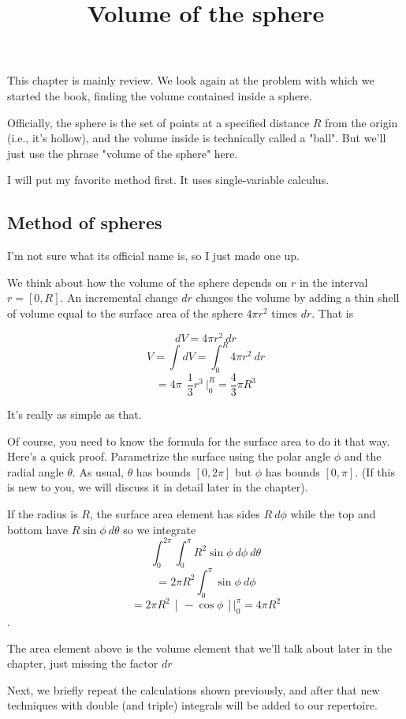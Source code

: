 \documentclass[11pt, oneside]{article}
\title{Volume of the sphere}
\date{}
\begin{document}
\maketitle
\Large


\label{sec:Volume_of_the_sphere}

This chapter is mainly review.  We look again at the problem with which we started the book, finding the volume contained inside a sphere.  

Officially, the sphere is the set of points at a specified distance $R$ from the origin (i.e., it's hollow), and the volume inside is technically called a "ball".  But we'll just use the phrase "volume of the sphere" here.

I will put my favorite method first.  It uses single-variable calculus.

\subsection*{Method of spheres}
I'm not sure what its official name is, so I just made one up.

We think about how the volume of the sphere depends on $r$ in the interval $r = [0,R]$.  An incremental change $dr$ changes the volume by adding a thin shell of volume equal to the surface area of the sphere $4 \pi r^2$ times $dr$.  That is

\[ dV = 4 \pi r^2 \ dr \]
\[ V = \int dV = \int_0^R 4 \pi r^2 \ dr \]
\[ = 4 \pi \ \ \frac{1}{3}r^3 \ \bigg |_0^R = \frac{4}{3}\pi R^3 \]

It's really as simple as that.

Of course, you need to know the formula for the surface area to do it that way.  Here's a quick proof.  Parametrize the surface using the polar  angle $\phi$ and the radial angle $\theta$.  As usual, $\theta$ has bounds $[0,2\pi]$ but $\phi$ has bounds $[0,\pi]$.  (If this is new to you, we will discuss it in detail later in the chapter).

If the radius is $R$, the surface area element has sides $R \ d \phi$ while the top and bottom have $R \sin \phi \ d \theta$ so we integrate
\[ \int_0^{2 \pi} \int_0^{\pi} R^2 \sin \phi \ d \phi \ d \theta \]
\[ = 2 \pi R^2 \int_0^{\pi} \sin \phi \ d \phi  \]
\[ = 2 \pi R^2 \ [ \ - \cos \phi \ ] \bigg |_0^{\pi} = 4 \pi R^2 \].

The area element above is the volume element that we'll talk about later in the chapter, just missing the factor $dr$

Next, we briefly repeat the calculations shown previously, and after that new techniques with double (and triple) integrals will be added to our repertoire.
\end{document}
